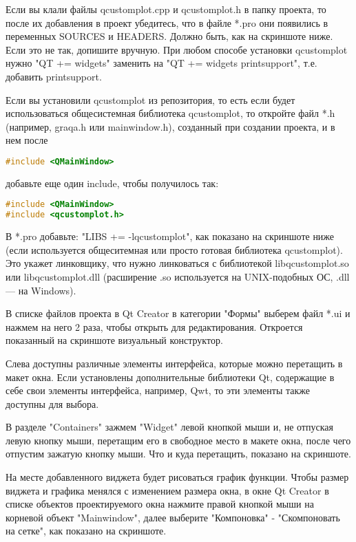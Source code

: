 Если вы клали файлы qcustomplot.cpp и qcustomplot.h в папку проекта, то после их добавления в проект убедитесь, что в файле *.pro они появились в переменных SOURCES и HEADERS. Должно быть, как на скриншоте ниже. Если это не так, допишите вручную. При любом способе установки qcustomplot нужно "QT += widgets" заменить на "QT += widgets printsupport", т.е. добавить printsupport.

Если вы установили qcustomplot из репозитория, то есть если будет использоваться общесистемная библиотека qcustomplot, то откройте файл *.h (например, graqa.h или mainwindow.h), созданный при создании проекта, и в нем после
\begin{lstlisting}[language=c++]
#include <QMainWindow>
\end{lstlisting}
добавьте еще один include, чтобы получилось так:
\begin{lstlisting}[language=c++]
#include <QMainWindow>
#include <qcustomplot.h>
\end{lstlisting}
В *.pro добавьте: "LIBS += -lqcustomplot", как показано на скриншоте ниже (если используется общеситемная или просто готовая библиотека qcustomplot). Это укажет линковщику, что нужно линковаться с библиотекой libqcustomplot.so или libqcustomplot.dll (расширение .so используется на UNIX-подобных ОС, .dll — на Windows).

В списке файлов проекта в Qt Creator в категории "Формы" выберем файл *.ui и нажмем на него 2 раза, чтобы открыть для редактирования. Откроется показанный на скриншоте визуальный конструктор.

Слева доступны различные элементы интерфейса, которые можно перетащить в макет окна. Если установлены дополнительные библиотеки Qt, содержащие в себе свои элементы интерфейса, например, Qwt, то эти элементы также доступны для выбора.

В разделе "Containers" зажмем "Widget" левой кнопкой мыши и, не отпуская левую кнопку мыши, перетащим его в свободное место в макете окна, после чего отпустим зажатую кнопку мыши. Что и куда перетащить, показано на скриншоте.

На месте добавленного виджета будет рисоваться график функции. Чтобы размер виджета и графика менялся с изменением размера окна, в окне Qt Creator в списке объектов проектируемого окна нажмите правой кнопкой мыши на корневой объект "Mainwindow", далее выберите "Компоновка" - "Скомпоновать на сетке", как показано на скриншоте.

